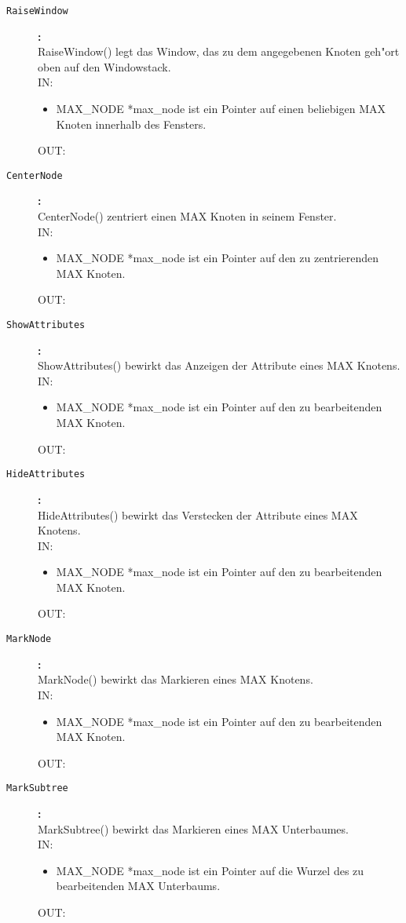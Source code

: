 \begin{description}
\item[\tt RaiseWindow]{\bf :\\}
RaiseWindow() legt das Window, das zu dem angegebenen Knoten geh"ort oben auf den Windowstack. \\
IN:
\begin{itemize}
   \item MAX\_NODE *max\_node ist ein Pointer auf einen beliebigen MAX Knoten innerhalb des Fensters.
\end{itemize}
OUT:

\item[\tt CenterNode]{\bf :\\}
CenterNode() zentriert einen MAX Knoten in seinem Fenster. \\
IN:
\begin{itemize}
   \item MAX\_NODE *max\_node ist ein Pointer auf den zu zentrierenden MAX Knoten.
\end{itemize}
OUT:

\item[\tt ShowAttributes]{\bf :\\}
ShowAttributes() bewirkt das Anzeigen der Attribute eines MAX Knotens. \\
IN:
\begin{itemize}
   \item MAX\_NODE *max\_node ist ein Pointer auf den zu bearbeitenden MAX Knoten.
\end{itemize}
OUT:

\item[\tt HideAttributes]{\bf :\\}
HideAttributes() bewirkt das Verstecken der Attribute eines MAX Knotens. \\
IN:
\begin{itemize}
   \item MAX\_NODE *max\_node ist ein Pointer auf den zu bearbeitenden MAX Knoten.
\end{itemize}
OUT:

\item[\tt MarkNode]{\bf :\\}
MarkNode() bewirkt das Markieren eines MAX Knotens. \\
IN:
\begin{itemize}
   \item MAX\_NODE *max\_node ist ein Pointer auf den zu bearbeitenden MAX Knoten.
\end{itemize}
OUT:

\item[\tt MarkSubtree]{\bf :\\}
MarkSubtree() bewirkt das Markieren eines MAX Unterbaumes. \\
IN:
\begin{itemize}
   \item MAX\_NODE *max\_node ist ein Pointer auf die Wurzel des zu bearbeitenden MAX Unterbaums.
\end{itemize}
OUT:


\end{description}
